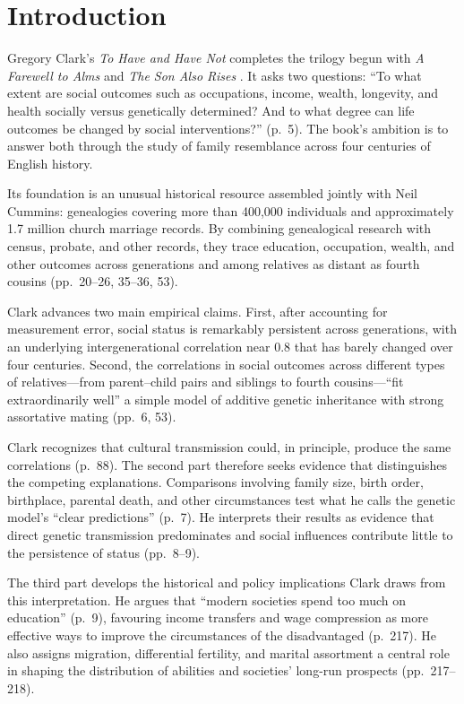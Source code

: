 \section{Introduction}
Gregory Clark's \emph{To Have and Have Not} \citeyearpar{Clark2026}
completes the trilogy begun with \emph{A Farewell to Alms}
\citeyearpar{Clark2007} and \emph{The Son Also Rises}
\citeyearpar{Clark2014}. It asks two questions: ``To what extent are
social outcomes such as occupations, income, wealth, longevity, and
health socially versus genetically determined? And to what degree can
life outcomes be changed by social interventions?'' (p.~5). The book's
ambition is to answer both through the study of family resemblance
across four centuries of English history.

Its foundation is an unusual historical resource assembled jointly with
Neil Cummins: genealogies covering more than 400,000 individuals and
approximately 1.7 million church marriage records. By combining
genealogical research with census, probate, and other records, they
trace education, occupation, wealth, and other outcomes across
generations and among relatives as distant as fourth cousins
(pp.~20--26, 35--36, 53).

Clark advances two main empirical claims. First, after accounting for
measurement error, social status is remarkably persistent across
generations, with an underlying intergenerational correlation near 0.8
that has barely changed over four centuries. Second, the correlations
in social outcomes across different types of relatives---from
parent--child pairs and siblings to fourth cousins---``fit
extraordinarily well'' a simple model of additive genetic inheritance
with strong assortative mating (pp.~6, 53).

Clark recognizes that cultural transmission could, in principle,
produce the same correlations (p.~88). The second part therefore seeks
evidence that distinguishes the competing explanations. Comparisons
involving family size, birth order, birthplace, parental death, and
other circumstances test what he calls the genetic model's ``clear
predictions'' (p.~7). He interprets their results as evidence that
direct genetic transmission predominates and social influences
contribute little to the persistence of status (pp.~8--9).

The third part develops the historical and policy implications Clark
draws from this interpretation. He argues that ``modern societies spend
too much on education'' (p.~9), favouring income transfers and wage
compression as more effective ways to improve the circumstances of the
disadvantaged (p.~217). He also assigns migration, differential
fertility, and marital assortment a central role in shaping the
distribution of abilities and societies' long-run prospects
(pp.~217--218).

